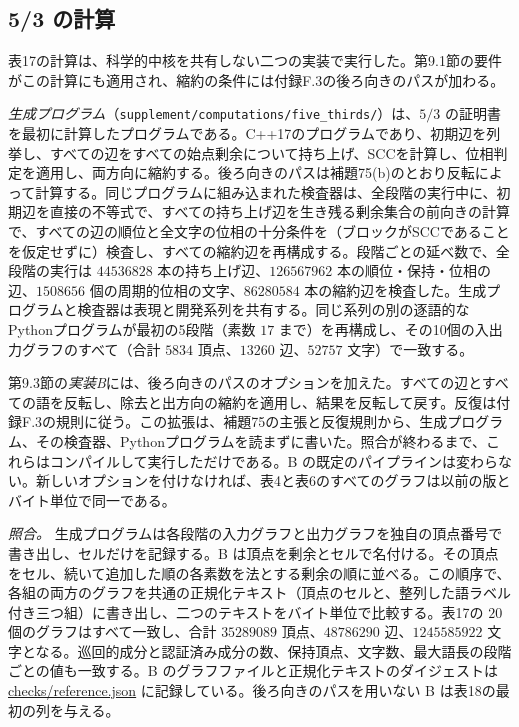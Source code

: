 \documentclass[11pt,reqno]{amsart}
\theoremstyle{definition}
\theoremstyle{definition}
\theoremstyle{remark}
\begin{document}
\subsection{5/3 の計算}\label{sec:9.5}

表17の計算は、科学的中核を共有しない二つの実装で実行した。第9.1節の要件がこの計算にも適用され、縮約の条件には付録F.3の後ろ向きのパスが加わる。

\emph{生成プログラム}（\nolinkurl{supplement/computations/five_thirds/}）は、\(5/3\) の証明書を最初に計算したプログラムである。C++17のプログラムであり、初期辺を列挙し、すべての辺をすべての始点剰余について持ち上げ、SCCを計算し、位相判定を適用し、両方向に縮約する。後ろ向きのパスは補題75(b)のとおり反転によって計算する。同じプログラムに組み込まれた検査器は、全段階の実行中に、初期辺を直接の不等式で、すべての持ち上げ辺を生き残る剰余集合の前向きの計算で、すべての辺の順位と全文字の位相の十分条件を（ブロックがSCCであることを仮定せずに）検査し、すべての縮約辺を再構成する。段階ごとの延べ数で、全段階の実行は \(44536828\) 本の持ち上げ辺、\(126567962\) 本の順位・保持・位相の辺、\(1508656\) 個の周期的位相の文字、\(86280584\) 本の縮約辺を検査した。生成プログラムと検査器は表現と開発系列を共有する。同じ系列の別の逐語的なPythonプログラムが最初の5段階（素数 \(17\) まで）を再構成し、その10個の入出力グラフのすべて（合計 \(5834\) 頂点、\(13260\) 辺、\(52757\) 文字）で一致する。

第9.3節の\emph{実装B}には、後ろ向きのパスのオプションを加えた。すべての辺とすべての語を反転し、除去と出方向の縮約を適用し、結果を反転して戻す。反復は付録F.3の規則に従う。この拡張は、補題75の主張と反復規則から、生成プログラム、その検査器、Pythonプログラムを読まずに書いた。照合が終わるまで、これらはコンパイルして実行しただけである。B の既定のパイプラインは変わらない。新しいオプションを付けなければ、表4と表6のすべてのグラフは以前の版とバイト単位で同一である。

\emph{照合。} 生成プログラムは各段階の入力グラフと出力グラフを独自の頂点番号で書き出し、セルだけを記録する。B は頂点を剰余とセルで名付ける。その頂点をセル、続いて追加した順の各素数を法とする剰余の順に並べる。この順序で、各組の両方のグラフを共通の正規化テキスト（頂点のセルと、整列した語ラベル付き三つ組）に書き出し、二つのテキストをバイト単位で比較する。表17の \(20\) 個のグラフはすべて一致し、合計 \(35289089\) 頂点、\(48786290\) 辺、\(1245585922\) 文字となる。巡回的成分と認証済み成分の数、保持頂点、文字数、最大語長の段階ごとの値も一致する。B のグラフファイルと正規化テキストのダイジェストは \href{checks/reference.json}{checks/reference.json} に記録している。後ろ向きのパスを用いない B は表18の最初の列を与える。
\end{document}
